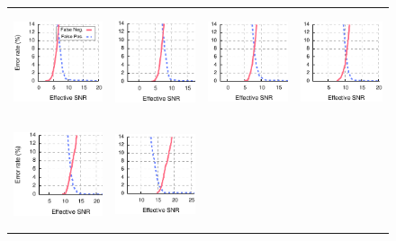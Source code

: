 \begin{figure}[p]
	\begin{xtrafullpage}
	\centering
	\begin{tabular}{cccc}
	\includegraphics[height=1.2in]{figures/delivery_figures/goodbad/esnr_goodbad_0.pdf} &
	\includegraphics[height=1.2in]{figures/delivery_figures/goodbad/esnr_goodbad_1.pdf} &
	\includegraphics[height=1.2in]{figures/delivery_figures/goodbad/esnr_goodbad_2.pdf} &
	\includegraphics[height=1.2in]{figures/delivery_figures/goodbad/esnr_goodbad_3.pdf} \\
	\includegraphics[height=1.2in]{figures/delivery_figures/goodbad/esnr_goodbad_4.pdf} &
	\includegraphics[height=1.2in]{figures/delivery_figures/goodbad/esnr_goodbad_5.pdf} &

\end{tabular}
\end{xtrafullpage}
\end{figure}
